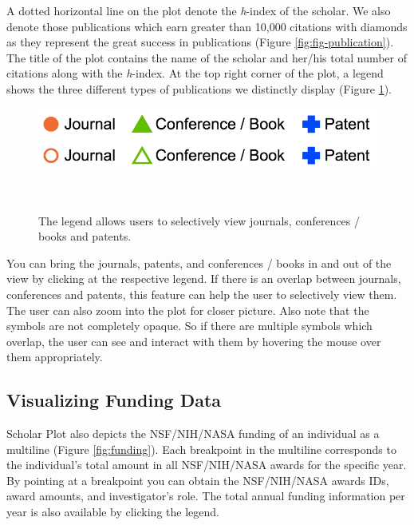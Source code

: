 A dotted horizontal line on the plot denote the {\it h}-index of the scholar. We also denote those publications which earn greater than 10,000 citations with diamonds as they represent the great success in publications (Figure \ref{fig:fig-publication}). The title of the plot contains the name of the scholar and her/his total number of citations along with the {\it h}-index. At the top right corner of the plot, a legend shows the three different types of publications we distinctly display (Figure \ref{fig:fig-legend}).

\begin{figure}[!htb]
\centering
  \includegraphics[width=0.9\columnwidth]{figures/fig_legend-toggle}
  \caption{The legend allows users to selectively view journals, conferences / books and patents.}~\label{fig:fig-legend}
\end{figure}

You can bring the journals, patents, and conferences / books in and out of the view by clicking at the respective legend. If there is an overlap between journals, conferences and patents, this feature can help the user to selectively view them. The user can also zoom into the plot for closer picture. Also note that the symbols are not completely opaque. So if there are multiple symbols which overlap, the user can see and interact with them by hovering the mouse over them appropriately.

\subsection{Visualizing Funding Data}
Scholar Plot also depicts the NSF/NIH/NASA funding of an individual as a multiline (Figure \ref{fig:funding}). Each breakpoint in the multiline corresponds to the individual's total amount in all NSF/NIH/NASA awards for the specific year. By pointing at a breakpoint you can obtain the NSF/NIH/NASA awards IDs, award amounts, and investigator's role. The total annual funding information per year is also available by clicking the legend. 

